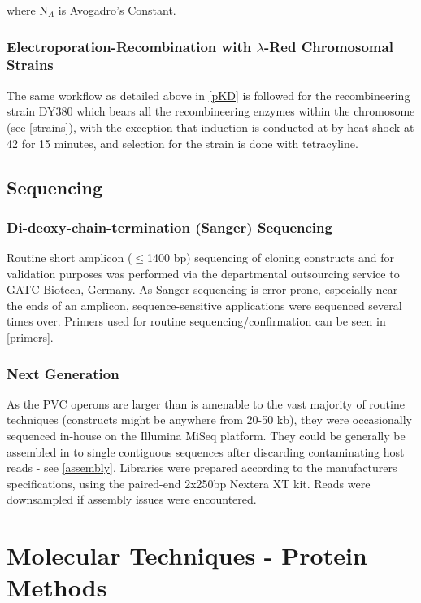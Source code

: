 \noindent where $\mathrm{N}_{A}$ is Avogadro's Constant.

\subsubsection{Electroporation-Recombination with $\lambda$-Red Chromosomal Strains}
The same workflow as detailed above in \vref{pKD} is followed for the recombineering strain DY380 which bears all the recombineering enzymes within the chromosome (see \vref{strains}), with the exception that induction is conducted at \OD{} by heat-shock at 42\degC{} for 15 minutes, and selection for the strain is done with tetracyline. 


\subsection{Sequencing}
	\subsubsection{Di-deoxy-chain-termination (Sanger) Sequencing}\label{Sanger}
	Routine short amplicon ($\leq$1400 bp) sequencing of cloning constructs and for validation purposes was performed via the departmental outsourcing service to GATC Biotech, Germany. As Sanger sequencing is error prone, especially near the ends of an amplicon, sequence-sensitive applications were sequenced several times over.
	Primers used for routine sequencing/confirmation can be seen in \vref{primers}.
	
	\subsubsection{Next Generation}
	As the PVC operons are larger than is amenable to the vast majority of routine techniques (constructs might be anywhere from 20-50 kb), they were occasionally sequenced in-house on the Illumina MiSeq platform. They could be generally be assembled in to single contiguous sequences after discarding contaminating host reads - see \vref{assembly}. Libraries were prepared according to the manufacturers specifications, using the paired-end 2x250bp Nextera XT kit. Reads were downsampled if assembly issues were encountered.




\section{Molecular Techniques - Protein Methods}

